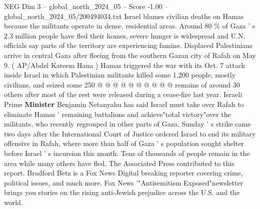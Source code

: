 \begin{textsample}{NEG Dim 3 – global\_north\_2024\_05 – Score -1.00 – global\_north\_2024\_05/200494034.txt}
Israel blames civilian deaths on Hamas because the militants operate in dense, residential areas.
Around 80 \% of Gaza ' s 2.3 million people have fled their homes, severe hunger is widespread and U.N. officials say parts of the territory are experiencing famine.
Displaced Palestinians arrive in central Gaza after fleeing from the southern Gazan city of Rafah on May 9. ( AP/Abdel Kareem Hana ) Hamas triggered the war with its Oct. 7 attack inside Israel in which Palestinian militants killed some 1,200 people, mostly civilians, and seized some 250 @ @ @ @ @ @ @ @ @ @ remains of around 30 others after most of the rest were released during a cease-fire last year.
Israeli Prime \textbf{Minister} Benjamin Netanyahu has said Israel must take over Rafah to eliminate Hamas ' remaining battalions and achieve"total victory"over the militants, who recently regrouped in other parts of Gaza.
Sunday ' s strike came two days after the International Court of Justice ordered Israel to end its military offensive in Rafah, where more than half of Gaza ' s population sought shelter before Israel ' s incursion this month.
Tens of thousands of people remain in the area while many others have fled.
The Associated Press contributed to this report.
Bradford Betz is a Fox News Digital breaking reporter covering crime, political issues, and much more.
Fox News '"Antisemitism Exposed"newsletter brings you stories on the rising anti-Jewish prejudice across the U.S. and the world.

\end{textsample}
